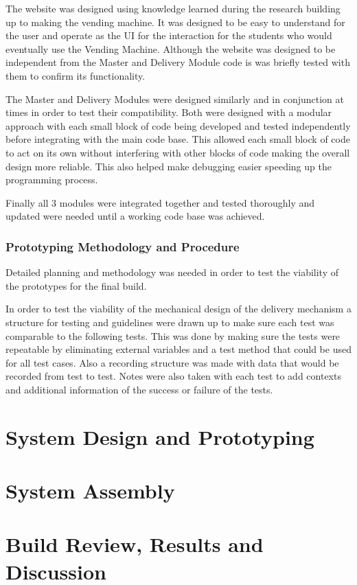 \documentclass[a4paper,11pt]{article}
\numberwithin{figure}{section}
\begin{document}
The website was designed using knowledge learned during the research building up to making the vending machine. It was designed to be easy to understand for the user and operate as the UI for the interaction for the students who would eventually use the Vending Machine. Although the website was designed to be independent from the Master and Delivery Module code is was briefly tested with them to confirm its functionality.

The Master and Delivery Modules were designed similarly and in conjunction at times in order to test their compatibility. Both were designed with a modular approach with each small block of code being developed and tested independently before integrating with the main code base. This allowed each small block of code to act on its own without interfering with other blocks of code making the overall design more reliable. This also helped make debugging easier speeding up the programming process.

Finally all 3 modules were integrated together and tested thoroughly and updated were needed until a working code base was achieved. 

\subsubsection{Prototyping Methodology and Procedure }
Detailed planning and methodology was needed in order to test the viability of the prototypes for the final build.

In order to test the viability of the mechanical design of the delivery mechanism a structure for testing and guidelines were drawn up to make sure each test was comparable to the following tests. This was done by making sure the tests were repeatable by eliminating external variables and a test method that could be used for all test cases. Also a recording structure was made with data that would be recorded from test to test. Notes were also taken with each test to add contexts and additional information of the success or failure of the tests.
\newpage

\section{System Design and Prototyping}
\newpage
\section{System Assembly}
\newpage
\section{Build Review, Results and Discussion}
\newpage
\end{document}
